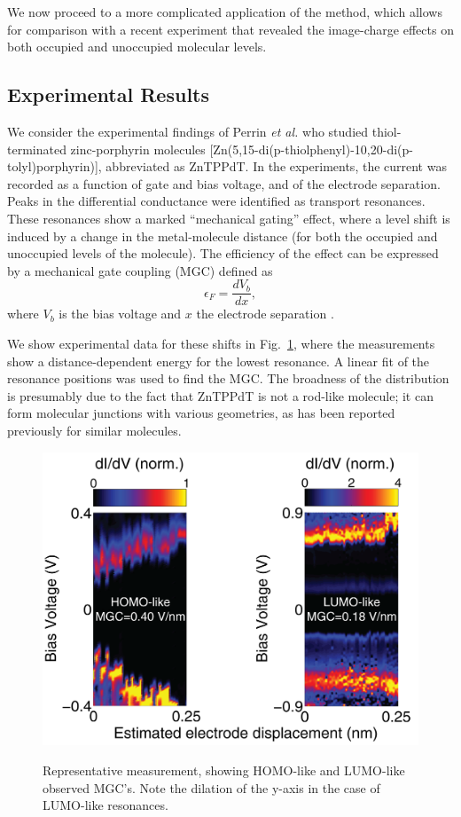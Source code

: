 \documentclass[aip,jcp,a4paper,reprint,floatfix,superscriptaddress]{revtex4-1}
\newcommand{\etal}{\emph{et al.}\xspace}
\begin{document}
We now proceed to a more complicated application of the method, which allows for comparison with a recent experiment that revealed the image-charge effects on both occupied and unoccupied molecular levels.


\subsection{Experimental Results}\label{experiments}

We consider the experimental findings of Perrin \etal\cite{Perrin2011a,Perrin2011b,Perrin2013} who studied thiol-terminated zinc-porphyrin molecules [Zn(5,15-di(p-thiolphenyl)-10,20-di(p-tolyl)porphyrin)], abbreviated as ZnTPPdT. 
In the experiments, the current was recorded as a function of gate and bias voltage, and of the electrode separation.
Peaks in the differential conductance were identified as transport resonances.
These resonances show a marked ``mechanical gating'' effect, where a level shift is induced by a change in the metal-molecule distance (for both the occupied and unoccupied levels of the molecule). The efficiency of the effect can be expressed by a mechanical gate coupling (MGC) defined as 
\begin{equation}
\epsilon_F=\frac{d V_b}{dx}, 
\end{equation}
where $V_b$ is the bias voltage and $x$ the electrode separation . 

We show experimental data for these shifts in Fig.~\ref{fg:experiment}, where the measurements show a distance-dependent energy for the lowest resonance. A linear fit of the resonance positions was used to find the MGC. 
The broadness of the distribution is presumably due to the fact that ZnTPPdT is not a rod-like molecule; it can form molecular junctions with various geometries, as has been reported previously for similar molecules.\cite{Perrin2011b}

\begin{figure}
\includegraphics[width=.9\columnwidth]{img/Fig3TH}\label{fg:exp_measurement}

\caption{Representative measurement,\cite{Perrin2013} showing HOMO-like and LUMO-like observed MGC's. Note the dilation of the y-axis in the case of LUMO-like resonances. 
}
\label{fg:experiment}
\end{figure}
\end{document}
